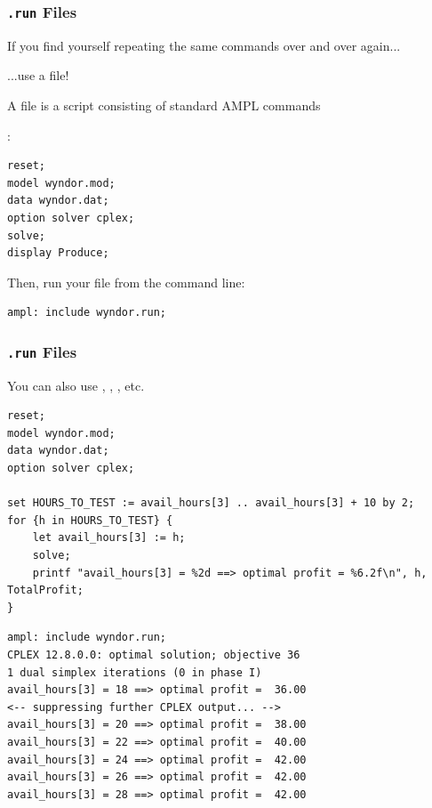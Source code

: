\begin{frame}[fragile]

	\frametitle{{\tt .run} Files}
	
	\bit
	\item If you find yourself repeating the same commands over and over again...
	\item ...use a  file!
	\item A  file is a script consisting of standard AMPL commands
	\eit

:
\begin{lstlisting}
reset;
model wyndor.mod;
data wyndor.dat;
option solver cplex;
solve;
display Produce;
\end{lstlisting}

	\bit
	\item Then, run your file from the command line:
	\eit

\begin{lstlisting}
ampl: include wyndor.run;
\end{lstlisting}

\end{frame}


\begin{frame}[fragile]

	\frametitle{{\tt .run} Files}
	
	\bit
	\item You can also use , , , etc.
	\eit

\begin{lstlisting}
reset;
model wyndor.mod;
data wyndor.dat;
option solver cplex;

set HOURS_TO_TEST := avail_hours[3] .. avail_hours[3] + 10 by 2;
for {h in HOURS_TO_TEST} {
	let avail_hours[3] := h;
	solve;
	printf "avail_hours[3] = %2d ==> optimal profit = %6.2f\n", h, TotalProfit;
}
\end{lstlisting}

\begin{lstlisting}
ampl: include wyndor.run;
CPLEX 12.8.0.0: optimal solution; objective 36
1 dual simplex iterations (0 in phase I)
avail_hours[3] = 18 ==> optimal profit =  36.00
<-- suppressing further CPLEX output... -->
avail_hours[3] = 20 ==> optimal profit =  38.00
avail_hours[3] = 22 ==> optimal profit =  40.00
avail_hours[3] = 24 ==> optimal profit =  42.00
avail_hours[3] = 26 ==> optimal profit =  42.00
avail_hours[3] = 28 ==> optimal profit =  42.00
\end{lstlisting}

\end{frame}


